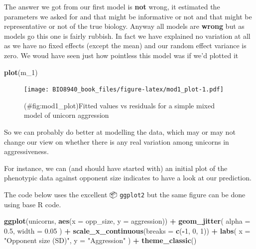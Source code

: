 \documentclass[
  12pt,
]{book}
\newenvironment{Shaded}{\begin{snugshade}}{\end{snugshade}}
\newcommand{\DataTypeTok}[1]{\textcolor[rgb]{0.13,0.29,0.53}{#1}}
\newcommand{\DecValTok}[1]{\textcolor[rgb]{0.00,0.00,0.81}{#1}}
\newcommand{\FloatTok}[1]{\textcolor[rgb]{0.00,0.00,0.81}{#1}}
\newcommand{\KeywordTok}[1]{\textcolor[rgb]{0.13,0.29,0.53}{\textbf{#1}}}
\newcommand{\NormalTok}[1]{#1}
\newcommand{\OperatorTok}[1]{\textcolor[rgb]{0.81,0.36,0.00}{\textbf{#1}}}
\newcommand{\StringTok}[1]{\textcolor[rgb]{0.31,0.60,0.02}{#1}}
\begin{document}
The answer we got from our first model is \textbf{not} wrong, it estimated the parameters we asked for and that might be informative or not and that might be representative or not of the true biology. Anyway all models are \textbf{wrong} but as models go this one is fairly rubbish. In fact we have explained no variation at all as we have no fixed effects (except the mean) and our random effect variance is zero. We woud have seen just how pointless this model was if we'd plotted it

\begin{Shaded}
\begin{Highlighting}[]
\KeywordTok{plot}\NormalTok{(m_}\DecValTok{1}\NormalTok{)}
\end{Highlighting}
\end{Shaded}

\begin{figure}
\centering
\texttt{[image: BIO8940\_book\_files/figure-latex/mod1\_plot-1.pdf]}
\caption{(\#fig:mod1\_plot)Fitted values vs residuals for a simple mixed model of unicorn aggression}
\end{figure}

So we can probably do better at modelling the data, which may or may not change our view on whether there is any real variation among unicorns in aggressiveness.

For instance, we can (and should have started with) an initial plot of the phenotypic data against opponent size indicates to have a look at our prediction.

The code below uses the excellent 📦 \texttt{ggplot2} but the same figure can be done using base R code.

\begin{Shaded}
\begin{Highlighting}[]
\KeywordTok{ggplot}\NormalTok{(unicorns, }\KeywordTok{aes}\NormalTok{(}\DataTypeTok{x =}\NormalTok{ opp_size, }\DataTypeTok{y =}\NormalTok{ aggression)) }\OperatorTok{+}
\StringTok{  }\KeywordTok{geom_jitter}\NormalTok{(}
    \DataTypeTok{alpha =} \FloatTok{0.5}\NormalTok{,}
    \DataTypeTok{width =} \FloatTok{0.05}
\NormalTok{  ) }\OperatorTok{+}
\StringTok{  }\KeywordTok{scale_x_continuous}\NormalTok{(}\DataTypeTok{breaks =} \KeywordTok{c}\NormalTok{(}\OperatorTok{-}\DecValTok{1}\NormalTok{, }\DecValTok{0}\NormalTok{, }\DecValTok{1}\NormalTok{)) }\OperatorTok{+}
\StringTok{  }\KeywordTok{labs}\NormalTok{(}
    \DataTypeTok{x =} \StringTok{"Opponent size (SD)"}\NormalTok{,}
    \DataTypeTok{y =} \StringTok{"Aggression"}
\NormalTok{  ) }\OperatorTok{+}
\StringTok{  }\KeywordTok{theme_classic}\NormalTok{()}
\end{Highlighting}
\end{Shaded}
\end{document}
